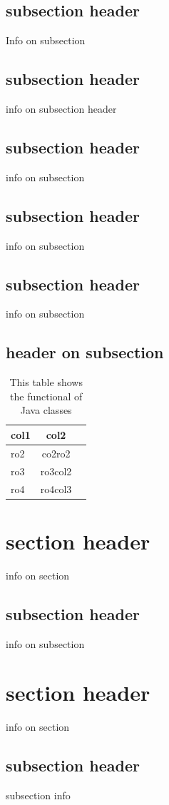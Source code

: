 \documentclass{project}
\begin{document}
\subsection{subsection header}
Info on subsection
\subsection{subsection header}
info on subsection header
\subsection{subsection header}
info on subsection
\subsection{subsection header}
info on subsection
\subsection{subsection header}
info on subsection

\subsection{header on subsection}
\begin{table}[!h]
\centering
\begin{tabular}{|l|c|r}
\hline
col1 & col2 \\ \hline
ro2 & co2ro2 \\ \hline
ro3 & ro3col2 \\ \hline
ro4 & ro4col3 \\ \hline
\end{tabular}
\caption{This table shows the functional of Java classes}
\label{tab:myfirsttable}
\end{table} 

\section{section header}
info on section
\subsection{subsection header} 
info on subsection
\section{section header}
info on section
\subsection{subsection header}
subsection info
\end{document}
